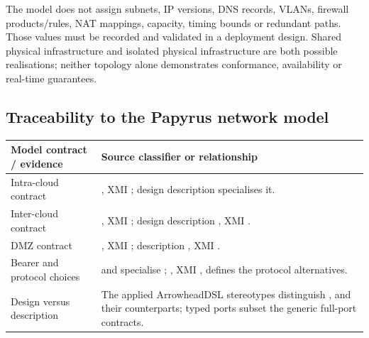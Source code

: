 The model does not assign subnets, IP versions, DNS records, VLANs, firewall products/rules, NAT mappings, capacity, timing bounds or redundant paths. Those values must be recorded and validated in a deployment design. Shared physical infrastructure and isolated physical infrastructure are both possible realisations; neither topology alone demonstrates conformance, availability or real-time guarantees.

\subsection{Traceability to the Papyrus network model}
\begin{longtable}{|P{3.2cm}|P{11.0cm}|}\hline
{} Model contract / evidence & Source classifier or relationship \\\hline\endhead
Intra-cloud contract & , XMI ; design description  specialises it. \\\hline
Inter-cloud contract & , XMI ; design description , XMI . \\\hline
DMZ contract & , XMI ; description , XMI . \\\hline
Bearer and protocol choices &  and  specialise ; , XMI , defines the protocol alternatives. \\\hline
Design versus description & The applied ArrowheadDSL stereotypes distinguish ,  and their  counterparts; typed ports subset the generic full-port contracts. \\\hline
\end{longtable}

